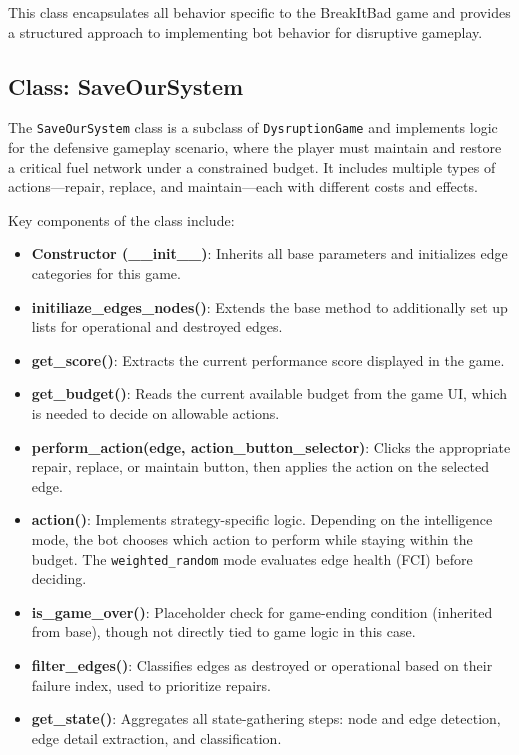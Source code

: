 \documentclass[12pt,a4paper]{article}
\begin{document}
        This class encapsulates all behavior specific to the BreakItBad game and provides a structured approach to implementing bot behavior for disruptive gameplay.


    \subsection*{Class: SaveOurSystem}
    \label{subsec:class-saveoursystem}

        The \texttt{SaveOurSystem} class is a subclass of \texttt{DysruptionGame} and implements logic for the defensive gameplay scenario, where the player must maintain and restore a critical fuel network under a constrained budget. It includes multiple types of actions—repair, replace, and maintain—each with different costs and effects.

        Key components of the class include:

        \begin{itemize}
            \item \textbf{Constructor (\_\_init\_\_)}: Inherits all base parameters and initializes edge categories for this game.

            \item \textbf{initiliaze\_edges\_nodes()}: Extends the base method to additionally set up lists for operational and destroyed edges.

            \item \textbf{get\_score()}: Extracts the current performance score displayed in the game.

            \item \textbf{get\_budget()}: Reads the current available budget from the game UI, which is needed to decide on allowable actions.

            \item \textbf{perform\_action(edge, action\_button\_selector)}: Clicks the appropriate repair, replace, or maintain button, then applies the action on the selected edge.

            \item \textbf{action()}: Implements strategy-specific logic. Depending on the intelligence mode, the bot chooses which action to perform while staying within the budget. The \texttt{weighted\_random} mode evaluates edge health (FCI) before deciding.

            \item \textbf{is\_game\_over()}: Placeholder check for game-ending condition (inherited from base), though not directly tied to game logic in this case.

            \item \textbf{filter\_edges()}: Classifies edges as destroyed or operational based on their failure index, used to prioritize repairs.

            \item \textbf{get\_state()}: Aggregates all state-gathering steps: node and edge detection, edge detail extraction, and classification.
        \end{itemize}
\end{document}
